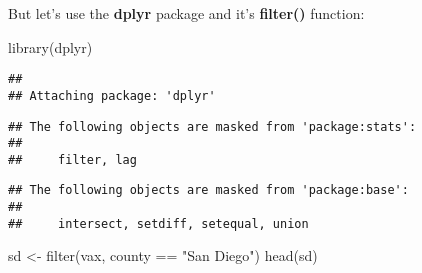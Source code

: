 \documentclass[
]{article}
\newenvironment{Shaded}{\begin{snugshade}}{\end{snugshade}}
\newcommand{\FunctionTok}[1]{\textcolor[rgb]{0.00,0.00,0.00}{#1}}
\newcommand{\NormalTok}[1]{#1}
\newcommand{\OtherTok}[1]{\textcolor[rgb]{0.56,0.35,0.01}{#1}}
\newcommand{\SpecialCharTok}[1]{\textcolor[rgb]{0.00,0.00,0.00}{#1}}
\newcommand{\StringTok}[1]{\textcolor[rgb]{0.31,0.60,0.02}{#1}}
\begin{document}
But let's use the \textbf{dplyr} package and it's \textbf{filter()}
function:

\begin{Shaded}
\begin{Highlighting}[]
\FunctionTok{library}\NormalTok{(dplyr)}
\end{Highlighting}
\end{Shaded}

\begin{verbatim}
## 
## Attaching package: 'dplyr'
\end{verbatim}

\begin{verbatim}
## The following objects are masked from 'package:stats':
## 
##     filter, lag
\end{verbatim}

\begin{verbatim}
## The following objects are masked from 'package:base':
## 
##     intersect, setdiff, setequal, union
\end{verbatim}

\begin{Shaded}
\begin{Highlighting}[]
\NormalTok{sd }\OtherTok{\textless{}{-}} \FunctionTok{filter}\NormalTok{(vax, county }\SpecialCharTok{==} \StringTok{"San Diego"}\NormalTok{)}
\FunctionTok{head}\NormalTok{(sd)}
\end{Highlighting}
\end{Shaded}
\end{document}
